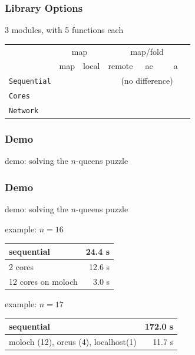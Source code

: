 \documentclass{beamer}
\let\emph\alert
\begin{document}
\begin{frame}\frametitle{Library Options}
  
  3 modules, with 5 functions each

  \begin{center}
    \begin{tabular}{|l|c|c|c|c|c|}
      \hline
                 & \multicolumn{2}{|c|}{map} &
                 \multicolumn{3}{|c|}{map/fold} \\\cline{2-6}
                 & map & local & remote & ~ac~ & ~~a~~ \\\hline\hline
      \texttt{Sequential} & & & \multicolumn{3}{|c|}{(no difference)} \\\hline
      \texttt{Cores}      & & & & & \\\hline
      \texttt{Network}    & & & & & \\\hline
    \end{tabular}
  \end{center}
\end{frame}

\begin{frame}\frametitle{Demo}
  \emph{demo}: solving the $n$-queens puzzle
\end{frame}

\begin{frame}\frametitle{Demo}
  \emph{demo}: solving the $n$-queens puzzle



  example: $n=16$
  \begin{center}
    \begin{tabular}{|l|r|}
      \hline
      sequential & 24.4 s \\\hline
      2 cores    & 12.6 s \\\hline
      12 cores on moloch & 3.0 s \\\hline
    \end{tabular}
  \end{center}

  example: $n=17$
  \begin{center}
    \begin{tabular}{|l|r|}
       \hline
      sequential & 172.0 s \\\hline
      moloch (12), orcus (4), localhost(1) & 11.7 s \\\hline
    \end{tabular}
  \end{center}
\end{frame}
\end{document}
